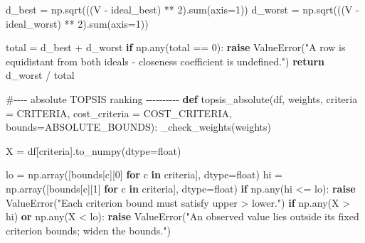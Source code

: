 \documentclass[
  12pt,
  letterpaper,
  12pt,
  oneside,
  english,
  onehalfspacing,
  headsepline]{MastersDoctoralThesis}
\newenvironment{Shaded}{\begin{snugshade}}{\end{snugshade}}
\newcommand{\BuiltInTok}[1]{\textcolor[rgb]{0.00,0.23,0.31}{#1}}
\newcommand{\CommentTok}[1]{\textcolor[rgb]{0.37,0.37,0.37}{#1}}
\newcommand{\ControlFlowTok}[1]{\textcolor[rgb]{0.00,0.23,0.31}{\textbf{#1}}}
\newcommand{\DecValTok}[1]{\textcolor[rgb]{0.68,0.00,0.00}{#1}}
\newcommand{\KeywordTok}[1]{\textcolor[rgb]{0.00,0.23,0.31}{\textbf{#1}}}
\newcommand{\NormalTok}[1]{\textcolor[rgb]{0.00,0.23,0.31}{#1}}
\newcommand{\OperatorTok}[1]{\textcolor[rgb]{0.37,0.37,0.37}{#1}}
\newcommand{\PreprocessorTok}[1]{\textcolor[rgb]{0.68,0.00,0.00}{#1}}
\newcommand{\StringTok}[1]{\textcolor[rgb]{0.13,0.47,0.30}{#1}}
\begin{document}
\begin{Shaded}
\begin{Highlighting}[]
\NormalTok{    d\_best }\OperatorTok{=}\NormalTok{ np.sqrt(((V }\OperatorTok{{-}}\NormalTok{ ideal\_best) }\OperatorTok{**} \DecValTok{2}\NormalTok{).}\BuiltInTok{sum}\NormalTok{(axis}\OperatorTok{=}\DecValTok{1}\NormalTok{))}
\NormalTok{    d\_worst }\OperatorTok{=}\NormalTok{ np.sqrt(((V }\OperatorTok{{-}}\NormalTok{ ideal\_worst) }\OperatorTok{**} \DecValTok{2}\NormalTok{).}\BuiltInTok{sum}\NormalTok{(axis}\OperatorTok{=}\DecValTok{1}\NormalTok{))}

\NormalTok{    total }\OperatorTok{=}\NormalTok{ d\_best }\OperatorTok{+}\NormalTok{ d\_worst}
    \ControlFlowTok{if}\NormalTok{ np.}\BuiltInTok{any}\NormalTok{(total }\OperatorTok{==} \DecValTok{0}\NormalTok{):}
        \ControlFlowTok{raise} \PreprocessorTok{ValueError}\NormalTok{(}\StringTok{"A row is equidistant from both ideals {-} closeness coefficient is undefined."}\NormalTok{)}
    \ControlFlowTok{return}\NormalTok{ d\_worst }\OperatorTok{/}\NormalTok{ total}


\CommentTok{\#{-}{-}{-}{-} absolute TOPSIS ranking {-}{-}{-}{-}{-}{-}{-}{-}{-}{-}}
\KeywordTok{def}\NormalTok{ topsis\_absolute(df, weights, criteria }\OperatorTok{=}\NormalTok{ CRITERIA, cost\_criteria }\OperatorTok{=}\NormalTok{ COST\_CRITERIA, bounds}\OperatorTok{=}\NormalTok{ABSOLUTE\_BOUNDS):}
\NormalTok{    \_check\_weights(weights)}

\NormalTok{    X }\OperatorTok{=}\NormalTok{ df[criteria].to\_numpy(dtype}\OperatorTok{=}\BuiltInTok{float}\NormalTok{)}

\NormalTok{    lo }\OperatorTok{=}\NormalTok{ np.array([bounds[c][}\DecValTok{0}\NormalTok{] }\ControlFlowTok{for}\NormalTok{ c }\KeywordTok{in}\NormalTok{ criteria], dtype}\OperatorTok{=}\BuiltInTok{float}\NormalTok{)}
\NormalTok{    hi }\OperatorTok{=}\NormalTok{ np.array([bounds[c][}\DecValTok{1}\NormalTok{] }\ControlFlowTok{for}\NormalTok{ c }\KeywordTok{in}\NormalTok{ criteria], dtype}\OperatorTok{=}\BuiltInTok{float}\NormalTok{)}
    \ControlFlowTok{if}\NormalTok{ np.}\BuiltInTok{any}\NormalTok{(hi }\OperatorTok{\textless{}=}\NormalTok{ lo):}
        \ControlFlowTok{raise} \PreprocessorTok{ValueError}\NormalTok{(}\StringTok{"Each criterion bound must satisfy upper \textgreater{} lower."}\NormalTok{)}
    \ControlFlowTok{if}\NormalTok{ np.}\BuiltInTok{any}\NormalTok{(X }\OperatorTok{\textgreater{}}\NormalTok{ hi) }\KeywordTok{or}\NormalTok{ np.}\BuiltInTok{any}\NormalTok{(X }\OperatorTok{\textless{}}\NormalTok{ lo):}
        \ControlFlowTok{raise} \PreprocessorTok{ValueError}\NormalTok{(}\StringTok{"An observed value lies outside its fixed criterion bounds; widen the bounds."}\NormalTok{)}


\end{Highlighting}
\end{Shaded}
\end{document}
